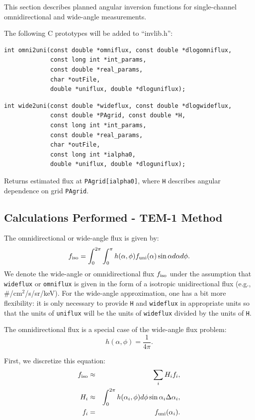 \documentclass{article}    %
\begin{document}
This section describes planned angular inversion functions for
single-channel omnidirectional and wide-angle measurements.

The following C prototypes will be added to ``invlib.h'':
\begin{verbatim}
int omni2uni(const double *omniflux, const double *dlogomniflux,
             const long int *int_params, 
             const double *real_params,
             char *outFile, 
             double *uniflux, double *dloguniflux);
\end{verbatim}

\begin{verbatim}
int wide2uni(const double *wideflux, const double *dlogwideflux,
             const double *PAgrid, const double *H, 
             const long int *int_params, 
             const double *real_params,
             char *outFile,
             const long int *ialpha0,
             double *uniflux, double *dloguniflux);
\end{verbatim}
Returns estimated flux at \verb|PAgrid[ialpha0]|, where \verb|H|
describes angular dependence on grid \verb|PAgrid|.

\subsection{Calculations Performed - TEM-1 Method}

The omnidirectional or wide-angle flux is given by:
\begin{equation}
f_{\rm iso} = \int_0^{2\pi} \int_0^{\pi} h(\alpha,\phi) f_{\rm uni}(\alpha) \sin\alpha d\alpha d\phi.
\end{equation}
We denote the wide-angle or omnidirectional flux $f_{\rm iso}$ under
the assumption that \verb|wideflux| or \verb|omniflux| is given in
the form of a isotropic unidirectional flux (e.g., \#/cm$^2$/s/sr/keV).
For the wide-angle approximation, one has a bit more flexibility: it
is only necessary to provide \verb|H| and \verb|wideflux| in
appropriate units so that the units of \verb|uniflux| will be the
units of \verb|wideflux| divided by the units of \verb|H|.

The omnidirectional flux is a special case of the wide-angle flux problem:
\begin{equation}
h(\alpha,\phi) = \frac{1}{4\pi}.
\end{equation}

First, we discretize this equation:
\begin{eqnarray}
f_{\rm iso} &\approx& \sum_i H_i f_i, \\ 
H_i &\approx& \int_0^{2\pi} h(\alpha_i,\phi) d\phi \sin\alpha_i \Delta\alpha_i, \\
f_i &=& f_{\rm uni}(\alpha_i).
\end{eqnarray}
\end{document}
